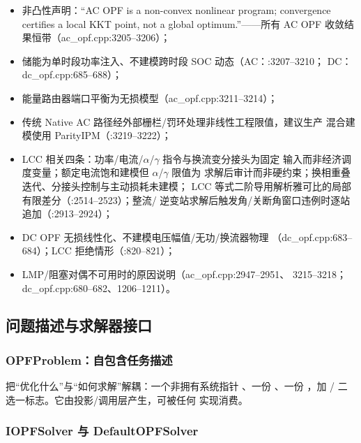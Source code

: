 \begin{itemize}
  \item 非凸性声明：``AC OPF is a non-convex nonlinear program; convergence
        certifies a local KKT point, not a global optimum.''——所有 AC OPF
        收敛结果恒带（ac\_opf.cpp:3205--3206）；
  \item 储能为单时段功率注入、不建模跨时段 SOC 动态（AC：:3207--3210；
        DC：dc\_opf.cpp:685--688）；
  \item 能量路由器端口平衡为无损模型（ac\_opf.cpp:3211--3214）；
  \item 传统 Native AC 路径经外部栅栏/罚环处理非线性工程限值，建议生产
        混合建模使用 ParityIPM（:3219--3222）；
  \item LCC 相关四条：功率/电流/$\alpha$/$\gamma$ 指令与换流变分接头为固定
        输入而非经济调度变量；额定电流饱和建模但 $\alpha$/$\gamma$ 限值为
        求解后审计而非硬约束；换相重叠迭代、分接头控制与主动损耗未建模；
        LCC 等式二阶导用解析雅可比的局部有限差分（:2514--2523）；整流/
        逆变站求解后触发角/关断角窗口违例时逐站追加（:2913--2924）；
  \item DC OPF 无损线性化、不建模电压幅值/无功/换流器物理
        （dc\_opf.cpp:683--684）；LCC 拒绝情形（:820--821）；
  \item LMP/阻塞对偶不可用时的原因说明（ac\_opf.cpp:2947--2951、
        3215--3218；dc\_opf.cpp:680--682、1206--1211）。
\end{itemize}

\subsection{问题描述与求解器接口}\label{subsec:overview-interface}

\subsubsection*{OPFProblem：自包含任务描述}


 把“优化什么”与“如何求解”解耦：一个非拥有系统指针
、一份 、一份 ，加
/ 二选一标志。它由投影/调用层产生，可被任何
 实现消费。

\subsubsection*{IOPFSolver 与 DefaultOPFSolver}

